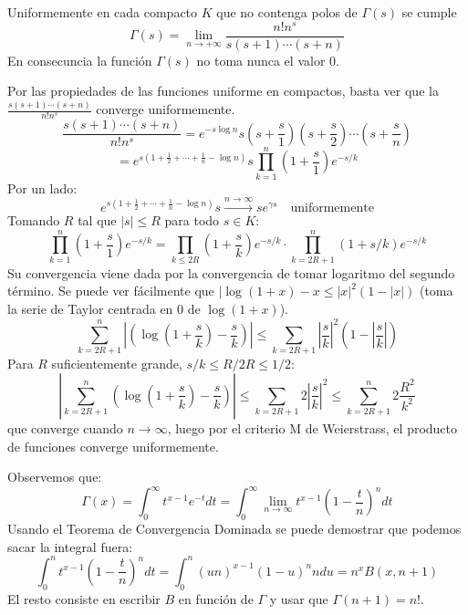 \documentclass[TAN.tex]{subfiles}
\begin{document}
\begin{prop} Uniformemente en cada compacto $K$ que no contenga polos de $Γ(s)$ se cumple
\[ Γ(s) = \lim_{n\to+∞} \frac{n!n^s}{s(s+1)\cdots(s+n)} \]
En consecuncia la función $Γ(s)$ no toma nunca el valor 0.
\end{prop}
\begin{dem}
Por las propiedades de las funciones uniforme en compactos, basta ver que la $\frac{s(s+1)\cdots(s+n)}{n!n^s}$ converge uniformemente.
\[ \frac{s(s+1)\cdots(s+n)}{n!n^s} = e^{-s \log n} s \left(s + \frac{s}{1}\right)\left(s + \frac{s}{2}\right)\cdots \left(s + \frac{s}{n}\right)\]
\[ = e^{s(1+\frac{1}{2}+\cdots+\frac{1}{n}-\log n)}s\prod_{k=1}^n\left(1+\frac{s}{1}\right)e^{-s/k}\]
Por un lado:
\[ e^{s(1+\frac{1}{2}+\cdots+\frac{1}{n}-\log n)}s \xrightarrow{n\to∞} se^{γs} \quad \text{uniformemente} \]
Tomando $R$ tal que $|s|≤R$ para todo $s \in K$:
\[\prod_{k=1}^n\left(1+\frac{s}{1}\right)e^{-s/k} = \prod_{k≤2R} \left(1+\frac{s}{k}\right)e^{-s/k} \cdot \prod_{k=2R+1}^n \left(1+s/k\right)e^{-s/k} \]
Su convergencia viene dada por la convergencia de tomar logaritmo del segundo término. Se puede ver fácilmente que $|\log(1+x)-x ≤ |x|^2(1-|x|)$ (toma la serie de Taylor centrada en $0$ de $\log(1+x)$).
\[ \sum_{k=2R+1}^n \left|\left(\log(1+\frac{s}{k})-\frac{s}{k}\right)\right| ≤ \sum_{k=2R+1} \left|\frac{s}{k}\right|^2\left(1-\left|\frac{s}{k}\right|\right) \]
Para $R$ suficientemente grande, $s/k ≤ R/2R ≤ 1/2$:
\[ \left|\sum_{k=2R+1}^n \left(\log(1+\frac{s}{k}) - \frac{s}{k}\right)\right| ≤ \sum_{k=2R+1} 2\left|\frac{s}{k}\right|^2 ≤ \sum_{k=2R+1}^n 2 \frac{R^2}{k^2} \]
que converge cuando $n \to ∞$, luego por el criterio M de Weierstrass, el producto de funciones converge uniformemente.

Observemos que:
\[ Γ(x) = \int_0^{∞} t^{x-1} e^{-t} dt =  \int_0^{∞} \lim_{n\to ∞} t^{x-1}\left(1-\frac{t}{n}\right)^n dt \]
Usando el Teorema de Convergencia Dominada se puede demostrar que podemos sacar la integral fuera:
\[ \int_0^n t^{x-1}\left(1-\frac{t}{n}\right)^n dt = \int_0^n (un)^{x-1}(1-u)^n ndu = n^x B(x,n+1) \]
El resto consiste en escribir $B$ en función de $Γ$ y usar que $Γ(n+1)=n!$.
\end{dem}
\end{document}
